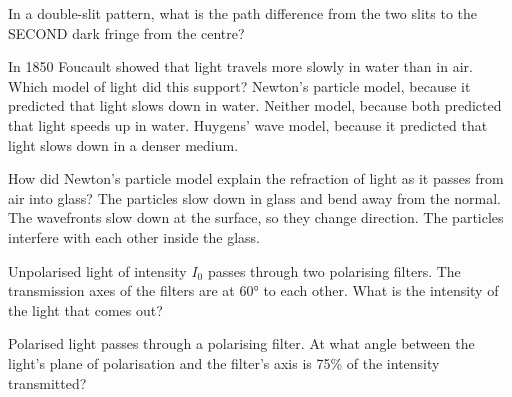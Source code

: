 \begin{quizq}{}
In a double-slit pattern, what is the path difference from the two slits to the SECOND dark fringe from
the centre?
\end{quizq}

\begin{quizq}{}
In 1850 Foucault showed that light travels more slowly in water than in air. Which model of light did
this support?
  {Newton's particle model, because it predicted that light slows down in water.}
  {Neither model, because both predicted that light speeds up in water.}
  {Huygens' wave model, because it predicted that light slows down in a denser medium.}
\end{quizq}

\begin{quizq}{}
How did Newton's particle model explain the refraction of light as it passes from air into glass?
  {The particles slow down in glass and bend away from the normal.}
  {The wavefronts slow down at the surface, so they change direction.}
  {The particles interfere with each other inside the glass.}
\end{quizq}

\begin{quizq}{}
Unpolarised light of intensity $I_0$ passes through two polarising filters. The transmission axes of the
filters are at \ang{60} to each other. What is the intensity of the light that comes out?
\end{quizq}

\begin{quizq}{}
Polarised light passes through a polarising filter. At what angle between the light's plane of
polarisation and the filter's axis is 75\% of the intensity transmitted?
\end{quizq}

